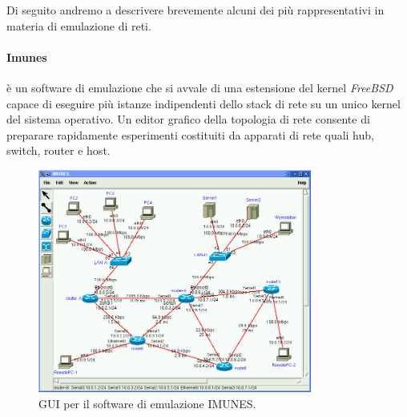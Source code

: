 Di seguito andremo a descrivere brevemente alcuni dei più rappresentativi in materia di emulazione di reti.

\paragraph{Imunes}\cite{OSSINI} è un software di emulazione che si avvale di una estensione del kernel \textit{FreeBSD} capace di eseguire più istanze indipendenti dello stack di rete su un unico kernel del sistema operativo. Un editor grafico della topologia di rete consente di preparare rapidamente esperimenti costituiti da apparati di rete quali hub, switch, router e host.
\begin{figure}[!ht]
	\centering
	\includegraphics[width=9cm]{images/imunes_gui_normal.png}
	\caption{GUI per il software di emulazione IMUNES.}
	\label{figura:imunes_gui}
\end{figure}


